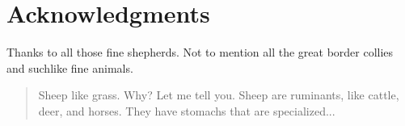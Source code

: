 %
%
%

\chapter{Acknowledgments}             %
Thanks to all those fine shepherds. Not to mention all the great
border collies and suchlike fine animals.

\begin{abstract}                %
Sheep like grass.  Why?  Let me tell you.  Sheep are ruminants, like
cattle, deer, and horses.  They have stomachs that are specialized...
\end{abstract}



